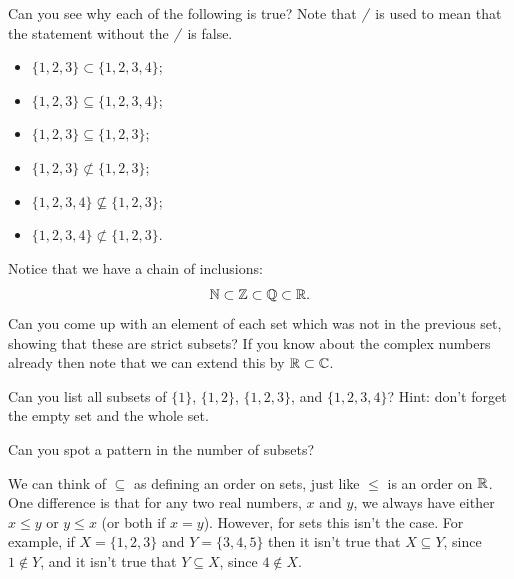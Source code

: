 \documentclass[fleqn]{LectureClass/LectureClass}
\begin{document}
    \begin{exm}{}{}
        Can you see why each of the following is true?
        Note that \(\cancel{\phantom{x}}\) is used to mean that the statement without the \(\cancel{\phantom{x}}\) is false.
        \begin{itemize}
            \item \(\{1, 2, 3\} \subset \{1, 2, 3, 4\}\);
            \item \(\{1, 2, 3\} \subseteq \{1, 2, 3, 4\}\);
            \item \(\{1, 2, 3\} \subseteq \{1, 2, 3\}\);
            \item \(\{1, 2, 3\} \not\subset \{1, 2, 3\}\);
            \item \(\{1, 2, 3, 4\} \not\subseteq \{1, 2, 3\}\);
            \item \(\{1, 2, 3, 4\} \not\subset \{1, 2, 3\}\).
        \end{itemize}
    \end{exm}
    
    \begin{exm}{}{}
        Notice that we have a chain of inclusions:
        \begin{equation}
            \mathbb{N} \subset \mathbb{Z} \subset \mathbb{Q} \subset \mathbb{R}.
        \end{equation}
        Can you come up with an element of each set which was not in the previous set, showing that these are strict subsets?
        If you know about the complex numbers already then note that we can extend this by \(\mathbb{R} \subset \mathbb{C}\).
    \end{exm}
    
    \begin{problem}{}{}
        Can you list all subsets of \(\{1\}\), \(\{1, 2\}\), \(\{1, 2, 3\}\), and \(\{1, 2, 3, 4\}\)?
        Hint: don't forget the empty set and the whole set.
        
        Can you spot a pattern in the number of subsets?
    \end{problem}
    
    We can think of \(\subseteq\) as defining an order on sets, just like \(\le\) is an order on \(\mathbb{R}\).
    One difference is that for any two real numbers, \(x\) and \(y\), we always have either \(x \le y\) or \(y \le x\) (or both if \(x = y\)).
    However, for sets this isn't the case.
    For example, if \(X = \{1, 2, 3\}\) and \(Y = \{3, 4, 5\}\) then it isn't true that \(X \subseteq Y\), since \(1 \notin Y\), and it isn't true that \(Y \subseteq X\), since \(4 \notin X\).
    
\end{document}
